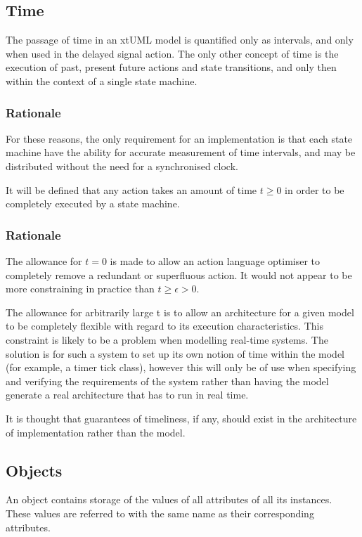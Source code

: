 \subsection{Time}
The passage of time in an xtUML model is quantified only as intervals, and
only when used in the \textsf{delayed signal} action. The only other concept of
time is the execution of past, present future actions and state transitions,
and only then within the context of a single state machine.

\subsubsection{Rationale}
For these reasons, the only requirement for an implementation is that each
state machine have the ability for accurate measurement of time intervals, and
may be distributed without the need for a synchronised clock.

It will be defined that any action takes an amount of time $t \geq 0$ in order
to be completely executed by a state machine.

\subsubsection{Rationale}
The allowance for $t = 0$ is made to allow an action language optimiser to
completely remove a redundant or superfluous action. It would not appear to
be more constraining in practice than $t \geq \epsilon > 0$.

The allowance for arbitrarily large t is to allow an architecture for a given
model to be completely flexible with regard to its execution characteristics.
This constraint is likely to be a problem when modelling real-time systems. The
solution is for such a system to set up its own notion of time within the model
(for example, a timer tick class), however this will only be of use when
specifying and verifying the requirements of the system rather than having the
model generate a real architecture that has to run in \textsf{real time}.

It is thought that guarantees of timeliness, if any, should exist in
the architecture of implementation rather than the model.

\subsection{Objects}
\label{subsec:objects}
An object contains storage of the values of all attributes of all its
instances. These values are referred to with the same name as their
corresponding attributes.


